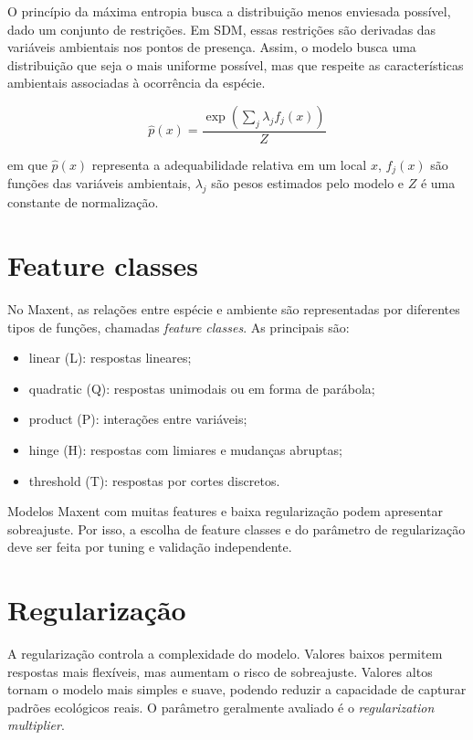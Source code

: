 O princípio da máxima entropia busca a distribuição menos enviesada possível, dado um conjunto de restrições. Em SDM, essas restrições são derivadas das variáveis ambientais nos pontos de presença. Assim, o modelo busca uma distribuição que seja o mais uniforme possível, mas que respeite as características ambientais associadas à ocorrência da espécie.

\begin{equationbox}
	\[
	\hat{p}(x) =
	\frac{\exp\left(\sum_j \lambda_j f_j(x)\right)}
	{Z}
	\]
\end{equationbox}

em que \(\hat{p}(x)\) representa a adequabilidade relativa em um local \(x\), \(f_j(x)\) são funções das variáveis ambientais, \(\lambda_j\) são pesos estimados pelo modelo e \(Z\) é uma constante de normalização.

\section{Feature classes}

No Maxent, as relações entre espécie e ambiente são representadas por diferentes tipos de funções, chamadas \textit{feature classes}. As principais são:

\begin{itemize}
	\item linear (L): respostas lineares;
	\item quadratic (Q): respostas unimodais ou em forma de parábola;
	\item product (P): interações entre variáveis;
	\item hinge (H): respostas com limiares e mudanças abruptas;
	\item threshold (T): respostas por cortes discretos.
\end{itemize}

\begin{atencao}[title={\faExclamationTriangle\quad Complexidade do Maxent}]
	Modelos Maxent com muitas features e baixa regularização podem apresentar sobreajuste. Por isso, a escolha de feature classes e do parâmetro de regularização deve ser feita por tuning e validação independente.
\end{atencao}

\section{Regularização}

A regularização controla a complexidade do modelo. Valores baixos permitem respostas mais flexíveis, mas aumentam o risco de sobreajuste. Valores altos tornam o modelo mais simples e suave, podendo reduzir a capacidade de capturar padrões ecológicos reais. O parâmetro geralmente avaliado é o \textit{regularization multiplier}.

